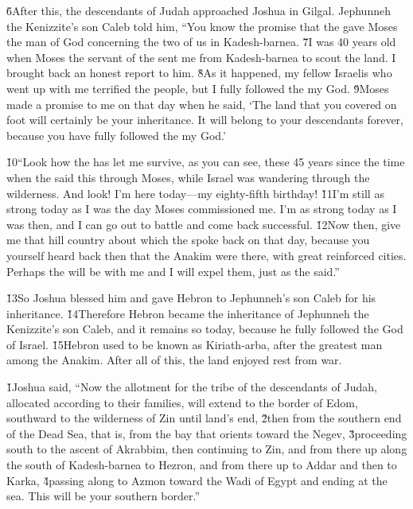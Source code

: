 \v{6}After this, the descendants of Judah approached Joshua in Gilgal. Jephunneh the Kenizzite's son Caleb told him, ``You know the promise that the  gave Moses the man of God concerning the two of us in Kadesh-barnea. \v{7}I was 40 years old when Moses the servant of the  sent me from Kadesh-barnea to scout the land. I brought back an honest report to him. \v{8}As it happened, my fellow Israelis who went up with me terrified the people, but I fully followed the  my God. \v{9}Moses made a promise to me on that day when he said, `The land that you covered on foot will certainly be your inheritance. It will belong to your descendants forever, because you have fully followed the  my God.'

\v{10}``Look how the  has let me survive, as you can see, these 45 years since the time when the  said this through Moses, while Israel was wandering through the wilderness. And look! I'm here today---my eighty-fifth birthday! \v{11}I'm still as strong today as I was the day Moses commissioned me. I'm as strong today as I was then, and I can go out to battle and come back successful. \v{12}Now then, give me that hill country about which the  spoke back on that day, because you yourself heard back then that the Anakim were there, with great reinforced cities. Perhaps the  will be with me and I will expel them, just as the  said.''

\v{13}So Joshua blessed him and gave Hebron to Jephunneh's son Caleb for his inheritance. \v{14}Therefore Hebron became the inheritance of Jephunneh the Kenizzite's son Caleb, and it remains so today, because he fully followed the  God of Israel. \v{15}Hebron used to be known as Kiriath-arba, after the greatest man among the Anakim. After all of this, the land enjoyed rest from war.

\v{1}Joshua said, ``Now the allotment for the tribe of the descendants of Judah, allocated according to their families, will extend to the border of Edom, southward to the wilderness of Zin until land's end, \v{2}then from the southern end of the Dead Sea, that is, from the bay that orients toward the Negev, \v{3}proceeding south to the ascent of Akrabbim, then continuing to Zin, and from there up along the south of Kadesh-barnea to Hezron, and from there up to Addar and then to Karka, \v{4}passing along to Azmon toward the Wadi of Egypt and ending at the sea. This will be your southern border.''

